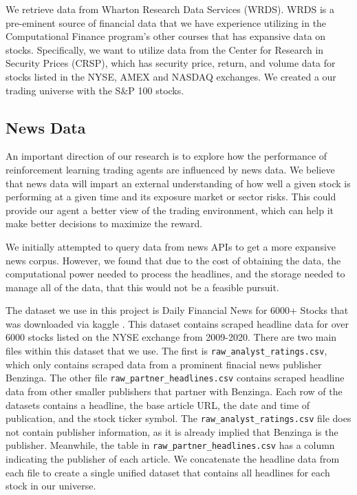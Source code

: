 We retrieve data from Wharton Research Data Services 
(WRDS). WRDS is a pre-eminent source of financial data that we have experience 
utilizing in the Computational Finance program’s other courses that has expansive 
data on stocks. Specifically, we want to utilize data from the Center for Research in 
Security Prices (CRSP), which has security price, return, and volume data for stocks listed in the 
NYSE, AMEX and NASDAQ exchanges. We created a our trading universe with the S$\&$P 100 stocks.

\subsection{News Data}

An important direction of our research is to explore how the performance 
of reinforcement learning trading agents are influenced by news data.
We believe that news data will impart an external understanding of how 
well a given stock is performing at a given time and its exposure market or sector risks. 
This could provide our agent a better view of the trading environment, which 
can help it make better decisions to maximize the reward. 

We initially attempted to query data from news APIs to get a more expansive news corpus. However, we found that due to the cost of obtaining the data, the computational power needed to process the headlines, and the storage needed to manage all of the data, that this would not be a feasible pursuit.

The dataset we use in this project is Daily Financial News for 6000+ Stocks that was downloaded via kaggle \cite{financial_news}.
This dataset contains scraped headline data for over 6000 stocks listed on the NYSE exchange from 2009-2020. 
There are two main files within this dataset that we use. The first is \texttt{raw\_analyst\_ratings.csv}, which only contains scraped data from a prominent finacial news publisher Benzinga.
The other file \texttt{raw\_partner\_headlines.csv} contains scraped headline data from other smaller publishers that partner with Benzinga. Each row of the datasets contains a headline, the base article URL, the date and time of publication, and the stock ticker symbol.
The \texttt{raw\_analyst\_ratings.csv} file does not contain publisher information, as it is already implied that Benzinga is the publisher. Meanwhile, the table in \texttt{raw\_partner\_headlines.csv} has a column indicating the publisher of each article. 
We concatenate the headline data from each file to create a single unified dataset that contains all headlines for each stock in our universe.



